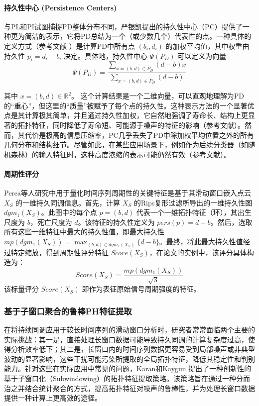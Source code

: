             \paragraph{持久性中心 (Persistence Centers)}
                \label{sec:feat_pcen}
                与PL和PI试图捕捉PD整体分布不同，严银凯提出的持久性中心（PC）提供了一种更为简洁的表示，它将PD总结为一个（或少数几个）代表性的点。一种具体的定义方式（参考文献 ）是计算PD中所有点 $(b_i, d_i)$ 的加权平均值，其中权重由持久性 $p_i = d_i - b_i$ 决定。具体地，持久性中心 $\Psi(P_D)$ 可以定义为向量
                \begin{equation}
                    \Psi(P_D) = \frac{\sum_{x=(b,d) \in P_D} (d-b) x}{\sum_{x=(b,d) \in P_D} (d-b)}
                    \end{equation}
                    
                    其中 $x = (b, d) \in \mathbb{R}^2$。                    
           这个计算结果是一个二维向量，可以直观地理解为PD的“重心”，但这里的“质量”被赋予了每个点的持久性。这种表示方法的一个显著优点是其计算极其简单，并且通过持久性加权，它自然地强调了寿命长、结构上更显著的拓扑特征，同时降低了寿命短、可能源于噪声的特征的影响（参考文献）。然而，其代价是极高的信息压缩率，PC几乎丢失了PD中除加权平均位置之外的所有几何分布和结构细节。尽管如此，在某些应用场景下，例如作为后续分类器（如随机森林）的输入特征时，这种高度浓缩的表示可能仍然有效（参考文献\cite{JSJC202406009}）。

            \paragraph{周期性评分}
Perea等人\cite{perea2015sliding}研究中用于量化时间序列周期性的关键特征是基于其滑动窗口嵌入点云 $X_S$ 的一维持久同调信息。首先，计算 $X_S$ 的Rips复形过滤所导出的一维持久性图 $dgm_1(X_S)$。此图中的每个点 $p=(b,d)$ 代表一个一维拓扑特征（环），其出生尺度为 $b$，死亡尺度为 $d$。该特征的持久性定义为 $pers(p) = d-b$。然后，选取所有这些一维特征中最大的持久性值，即最大持久性 $mp(dgm_1(X_S)) = \max_{(b,d) \in dgm_1(X_S)} \{d-b\}$。最终，将此最大持久性值经过特定缩放，得到周期性评分特征 $Score(X_S)$，在论文的实例中，该评分具体构造为：
\begin{equation}
Score(X_S) = \frac{mp(dgm_1(X_S))}{\sqrt{3}}
\end{equation}
该标量评分 $Score(X_S)$ 即作为表征原始信号周期强度的特征。
        \subsubsection{基于子窗口聚合的鲁棒PH特征提取}
        在将持续同调应用于较长时间序列的滑动窗口分析时，研究者常常面临两个主要的实际挑战：其一是，直接处理长窗口数据可能导致持久同调的计算复杂度过高，使得分析效率低下；其二是，长窗口内的时间序列数据更容易受到局部噪声或非典型波动的显著影响，这些干扰可能污染所提取的全局拓扑特征，降低其稳定性和判别能力。针对这些在实际应用中常见的问题，Karan和Kaygun \cite{3} 提出了一种创新性的基于子窗口化（Subwindowing）的拓扑特征提取策略。该策略旨在通过一种分而治之并结合统计聚合的方式，提高拓扑特征对噪声的鲁棒性，并为处理长窗口数据提供一种计算上更高效的途径。

